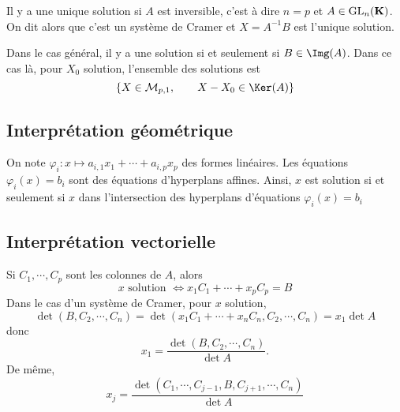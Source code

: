Il y a une unique solution si  $A$ est inversible, c'est à dire  $n=p$ et  $A \in  \mathrm{GL}_n(\mathbf K)$. On dit alors que c'est un système de Cramer et $X=A^{-1}B$ est l'unique solution.

Dans le cas général, il y a une solution si et seulement si $B \in  \Img (A)$. Dans ce cas là, pour $X_0$ solution, l'ensemble des solutions est  \[
    \{X \in \mathcal M_{p,1}, \qquad  X-X_0 \in  \Ker(A)\} 
\] 


\subsection{Interprétation géométrique}

On note $\varphi_i: x \longmapsto a_{i,1}x_1+\cdots +a_{i,p}x_p$ des formes linéaires. Les équations $\varphi_i(x)=b_i$ sont des équations d'hyperplans affines. Ainsi,  $x$ est solution  si et seulement si $x$ dans  l'intersection des hyperplans d'équations  $\varphi_i(x)=b_i$

\subsection{Interprétation vectorielle}

Si $C_1, \cdots , C_p$ sont les colonnes de $A$, alors  \[
    x \text{ solution } \iff  x_1C_1+\cdots +x_pC_p=B
\]
Dans le cas d'un système de Cramer, pour $x$ solution, \[
    \det(B, C_2, \cdots , C_n)=\det(x_1C_1+\cdots +x_nC_n, C_2, \cdots , C_n)=x_1 \det A
\] 
donc  \[
    x_1= \frac{\det(B, C_2, \cdots , C_n)}{\det A}.
\]
De même, \[
    x_j= \frac{\det(C_1, \cdots , C_{j-1}, B, C_{j+1},\cdots ,C_n)}{\det A}
\] 

\endchapter
